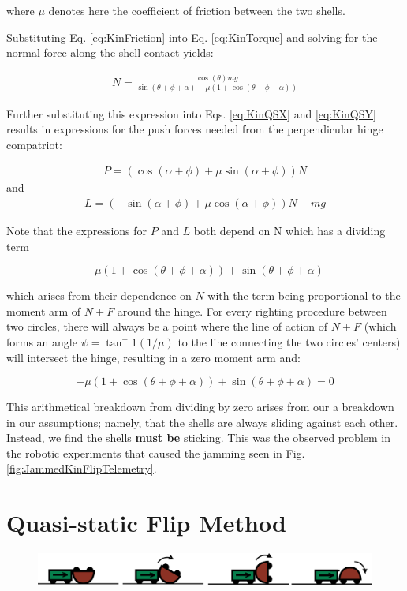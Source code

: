 \documentclass[letterpaper, 10 pt, conference]{ieeeconf}
\begin{document}
where $\mu$ denotes here the coefficient of friction between the two shells.

Substituting Eq. \ref{eq:KinFriction} into Eq. \ref{eq:KinTorque} and solving for the normal force along the shell contact yields:

\begin{align}
N = \frac{\cos(\theta) m g}{\sin(\theta + \phi + \alpha) - \mu (1+\cos(\theta + \phi + \alpha)) }
\end{align}

Further substituting this expression into Eqs. \ref{eq:KinQSX} and \ref{eq:KinQSY} results in expressions for the push forces needed from the perpendicular hinge compatriot:

\begin{align}
P = ( \cos(\alpha+\phi) + \mu \sin(\alpha+\phi) ) N
\end{align}
and
\begin{align}
L = ( -\sin(\alpha+\phi) + \mu \cos(\alpha+\phi) ) N + mg
\end{align}

Note that the expressions for $P$ and $L$ both depend on N which has a dividing term

$$-\mu (1+\cos(\theta + \phi + \alpha)) + \sin(\theta + \phi + \alpha)$$

which arises from their dependence on $N$ with the term being proportional to the moment arm of $N+F$ around the hinge.
For every righting procedure between two circles, there will always be a point where the line of action of $N+F$ (which forms an angle $\psi = \tan^-1(1/\mu)$ to the line connecting the two circles' centers) will intersect the hinge, resulting in a zero moment arm and:

$$-\mu (1+\cos(\theta + \phi + \alpha)) + \sin(\theta + \phi + \alpha) = 0$$

This arithmetical breakdown from dividing by zero arises from our a breakdown in our assumptions; namely, that the shells are always sliding against each other.
Instead, we find the shells \textbf{must be} sticking.
This was the observed problem in the robotic experiments that caused the jamming seen in Fig. \ref{fig:JammedKinFlipTelemetry}.

\section{Quasi-static Flip Method}
\begin{figure}[ht]
\centering
\includegraphics[width=1.0\columnwidth]{QuasiStatic_CoopCartoon.png}
\end{figure}
\end{document}
